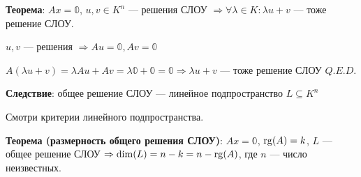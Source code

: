 \textbf{Теорема}: \(Ax = \mathbb{0}\), \(u,v \in K^n\) --- решения СЛОУ \(\Rightarrow \forall \lambda \in K: \lambda u + v\) --- тоже решение СЛОУ.

\(u, v\) --- решения \(\Rightarrow Au = \mathbb{0}, Av = \mathbb{0}\)

\(A(\lambda u + v) = \lambda Au + Av = \lambda \mathbb{0} + \mathbb{0} = \mathbb{0} \Rightarrow \lambda u + v\) --- тоже решение СЛОУ \(Q.E.D.\)

\textbf{Следствие}: общее решение СЛОУ --- линейное подпространство \(L \subseteq K^n\)

Смотри критерии линейного подпространства.

\textbf{Теорема (размерность общего  решения СЛОУ)}: \(Ax = \mathbb{0}\), \(\operatorname{rg}(A) = k\), \(L\) --- общее решение СЛОУ \(\Rightarrow \dim(L) = n - k = n - \operatorname{rg}(A)\), где \(n\) --- число неизвестных.

